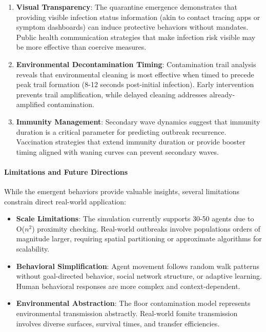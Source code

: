 \begin{enumerate}
    \item \textbf{Visual Transparency}: The quarantine emergence demonstrates that providing visible infection status information (akin to contact tracing apps or symptom dashboards) can induce protective behaviors without mandates. Public health communication strategies that make infection risk visible may be more effective than coercive measures.
    
    \item \textbf{Environmental Decontamination Timing}: Contamination trail analysis reveals that environmental cleaning is most effective when timed to precede peak trail formation (8-12 seconds post-initial infection). Early intervention prevents trail amplification, while delayed cleaning addresses already-amplified contamination.
    
    \item \textbf{Immunity Management}: Secondary wave dynamics suggest that immunity duration is a critical parameter for predicting outbreak recurrence. Vaccination strategies that extend immunity duration or provide booster timing aligned with waning curves can prevent secondary waves.
\end{enumerate}

\paragraph{Limitations and Future Directions}

While the emergent behaviors provide valuable insights, several limitations constrain direct real-world application:

\begin{itemize}
    \item \textbf{Scale Limitations}: The simulation currently supports 30-50 agents due to O($n^2$) proximity checking. Real-world outbreaks involve populations orders of magnitude larger, requiring spatial partitioning or approximate algorithms for scalability.
    
    \item \textbf{Behavioral Simplification}: Agent movement follows random walk patterns without goal-directed behavior, social network structure, or adaptive learning. Human behavioral responses are more complex and context-dependent.
    
    \item \textbf{Environmental Abstraction}: The floor contamination model represents environmental transmission abstractly. Real-world fomite transmission involves diverse surfaces, survival times, and transfer efficiencies.
\end{itemize}


